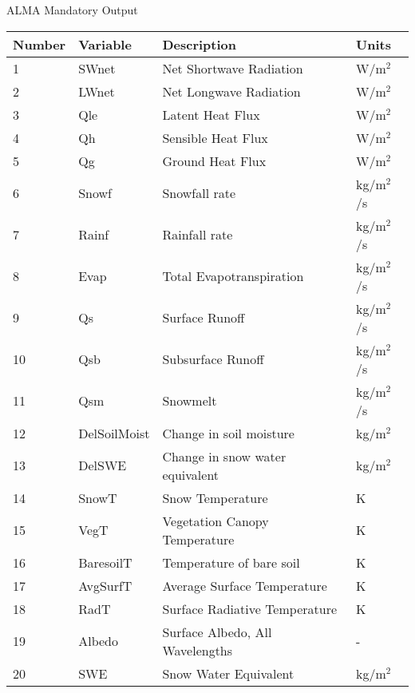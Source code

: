
\setlength{\extrarowheight}{4pt}

\begin{verbatim}

\end{verbatim}

ALMA Mandatory Output

\begin{tabular}{|l|l|l|l|} \hline \label{table:clm2_alma_out}
Number & Variable & Description                     & Units         \\ \hline
1  & SWnet        & Net Shortwave Radiation         & W/m$^2$       \\ \hline
2  & LWnet        & Net Longwave Radiation          & W/m$^2$       \\ \hline
3  & Qle          & Latent Heat Flux                & W/m$^2$       \\ \hline
4  & Qh           & Sensible Heat Flux              & W/m$^2$       \\ \hline
5  & Qg           & Ground Heat Flux                & W/m$^2$       \\ \hline
6  & Snowf        & Snowfall rate                   & kg/m$^2$/s    \\ \hline
7  & Rainf        & Rainfall rate                   & kg/m$^2$/s    \\ \hline
8  & Evap         & Total Evapotranspiration        & kg/m$^2$/s    \\ \hline
9  & Qs           & Surface Runoff                  & kg/m$^2$/s    \\ \hline
10 & Qsb          & Subsurface Runoff               & kg/m$^2$/s    \\ \hline
11 & Qsm          & Snowmelt                        & kg/m$^2$/s    \\ \hline
12 & DelSoilMoist & Change in soil moisture         & kg/m$^2$      \\ \hline
13 & DelSWE       & Change in snow water equivalent & kg/m$^2$      \\ \hline
14 & SnowT        & Snow Temperature                & K             \\ \hline
15 & VegT         & Vegetation Canopy Temperature   & K             \\ \hline
16 & BaresoilT    & Temperature of bare soil        & K             \\ \hline
17 & AvgSurfT     & Average Surface Temperature     & K             \\ \hline
18 & RadT         & Surface Radiative Temperature   & K             \\ \hline
19 & Albedo       & Surface Albedo, All Wavelengths & -             \\ \hline
20 & SWE          & Snow Water Equivalent           & kg/m$^2$      \\ \hline
\end{tabular}

